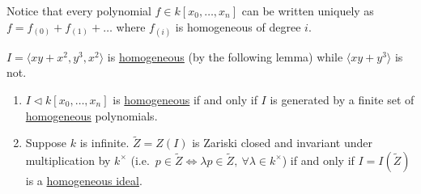 \documentclass{article}
\begin{document}
Notice that every polynomial $f\in k[x_0, \dotsc, x_n]$ can be written uniquely as $f = f_{(0)} + f_{(1)} + \dotsc$ where $f_{(i)}$ is homogeneous of degree $i$.
\begin{eg}
    $I = \langle x y + x^2, y^3 , x^2 \rangle$ is \hyperlink{def:homIdeal}{homogeneous} (by the following lemma) while $\langle x y + y^3 \rangle$ is not.
\end{eg}
\begin{lemma} \leavevmode
    \begin{enumerate}[label=(\roman*)]
        \item $I \lhd k[x_0, \dotsc, x_n]$ is \hyperlink{def:homIdeal}{homogeneous} if and only if $I$ is generated by a finite set of \hyperlink{def:homPoly}{homogeneous} polynomials.
        \item Suppose $k$ is infinite. $\tilde{Z} = Z(I)$ is Zariski closed and invariant under multiplication by $k^\times$ (i.e.\ $p \in \tilde{Z} \iff \lambda p \in \tilde{Z}, \ \forall \lambda \in k^\times$) if and only if $I = I(\tilde{Z})$ is a \hyperlink{def:homIdeal}{homogeneous ideal}.
    \end{enumerate}
\end{lemma}
\end{document}
